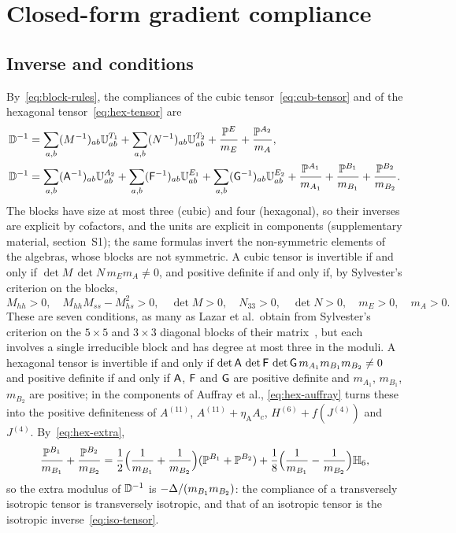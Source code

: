 \section{Closed-form gradient compliance}\label{sec:compliance}

\subsection{Inverse and conditions}\label{sec:compliance-inverse}

By~\eqref{eq:block-rules}, the compliances of the cubic tensor~\eqref{eq:cub-tensor} and
of the hexagonal tensor~\eqref{eq:hex-tensor} are
\begin{equation}
\begin{aligned}
\mathbb{D}^{-1}&=\sum_{a,b}(M^{-1})_{ab}\mathbb{U}^{T_1}_{ab}+\sum_{a,b}(N^{-1})_{ab}\mathbb{U}^{T_2}_{ab}
+\frac{\mathbb{P}^{E}}{m_E}+\frac{\mathbb{P}^{A_2}}{m_A},\\
\mathbb{D}^{-1}&=\sum_{a,b}(\mathsf{A}^{-1})_{ab}\mathbb{U}^{A_2}_{ab}+\sum_{a,b}(\mathsf{F}^{-1})_{ab}\mathbb{U}^{E_1}_{ab}
+\sum_{a,b}(\mathsf{G}^{-1})_{ab}\mathbb{U}^{E_2}_{ab}
+\frac{\mathbb{P}^{A_1}}{m_{A_1}}+\frac{\mathbb{P}^{B_1}}{m_{B_1}}+\frac{\mathbb{P}^{B_2}}{m_{B_2}}.
\end{aligned}\label{eq:compliance}
\end{equation}
The blocks have size at most three (cubic) and four (hexagonal), so their inverses are
explicit by cofactors, and the units are explicit in components (supplementary
material, section~S1); the same formulas invert the non-symmetric elements of the
algebras, whose blocks are not symmetric. A cubic tensor is invertible if and only if
$\det M\,\det N\,m_Em_A\ne0$, and positive definite if and only if, by Sylvester's
criterion on the blocks,
\begin{equation}
M_{hh}>0,\quad M_{hh}M_{ss}-M_{hs}^2>0,\quad \det M>0,\quad N_{33}>0,\quad \det N>0,
\quad m_E>0,\quad m_A>0.\label{eq:cub-pd}
\end{equation}
These are seven conditions, as many as Lazar et al.\ obtain from Sylvester's criterion
on the $5\times5$ and $3\times3$ diagonal blocks of their matrix~\cite[appendix~A,
eqs.~(A.7)]{Lazar2022}, but each involves a single irreducible block and has degree at
most three in the moduli. A hexagonal tensor is invertible if and only if $\det\mathsf{A}\,\det\mathsf{F}\,\det\mathsf{G}\,
m_{A_1}m_{B_1}m_{B_2}\ne0$ and positive definite if and only if $\mathsf{A}$, $\mathsf{F}$ and
$\mathsf{G}$ are positive definite and $m_{A_1}$, $m_{B_1}$, $m_{B_2}$ are positive; in the
components of Auffray et al., \eqref{eq:hex-auffray} turns these into the positive
definiteness of $A^{(11)}$, $A^{(11)}+\eta_{\mathrm A}A_c$, $H^{(6)}+f(J^{(4)})$ and $J^{(4)}$.
By~\eqref{eq:hex-extra},
\begin{equation}
\frac{\mathbb{P}^{B_1}}{m_{B_1}}+\frac{\mathbb{P}^{B_2}}{m_{B_2}}
=\frac12\Big(\frac1{m_{B_1}}+\frac1{m_{B_2}}\Big)(\mathbb{P}^{B_1}+\mathbb{P}^{B_2})
+\frac18\Big(\frac1{m_{B_1}}-\frac1{m_{B_2}}\Big)\mathbb{H}_{6},\label{eq:hex-extra-compliance}
\end{equation}
so the extra modulus of $\mathbb{D}^{-1}$ is $-\Delta/(m_{B_1}m_{B_2})$: the compliance of a
transversely isotropic tensor is transversely isotropic, and that of an isotropic tensor
is the isotropic inverse~\eqref{eq:iso-tensor}.

